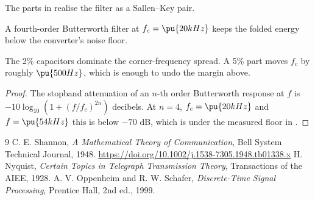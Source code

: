 The parts in  realise the filter as a Sallen–Key pair.

\begin{proposition}
\label{prop-order}
A fourth-order Butterworth filter at $f_c = \pu{20 kHz}$ keeps the folded energy below the converter's noise floor.
\end{proposition}

\begin{warning}
The 2\% capacitors dominate the corner-frequency spread. A 5\% part moves $f_c$ by roughly $\pu{500 Hz}$, which is enough to undo the margin above.
\end{warning}

\begin{proof}
The stopband attenuation of an $n$-th order Butterworth response at $f$ is $-10\log_{10}\left(1 + (f/f_c)^{2n}\right)$ decibels. At $n = 4$, $f_c = \pu{20 kHz}$ and $f = \pu{54 kHz}$ this is below $-70$ dB, which is under the measured floor in .
\end{proof}

\begin{thebibliography}{9}
 C. E. Shannon, \emph{A Mathematical Theory of Communication}, Bell System Technical Journal, 1948. \url{https://doi.org/10.1002/j.1538-7305.1948.tb01338.x}
 H. Nyquist, \emph{Certain Topics in Telegraph Transmission Theory}, Transactions of the AIEE, 1928.
 A. V. Oppenheim and R. W. Schafer, \emph{Discrete-Time Signal Processing}, Prentice Hall, 2nd ed., 1999.
\end{thebibliography}



